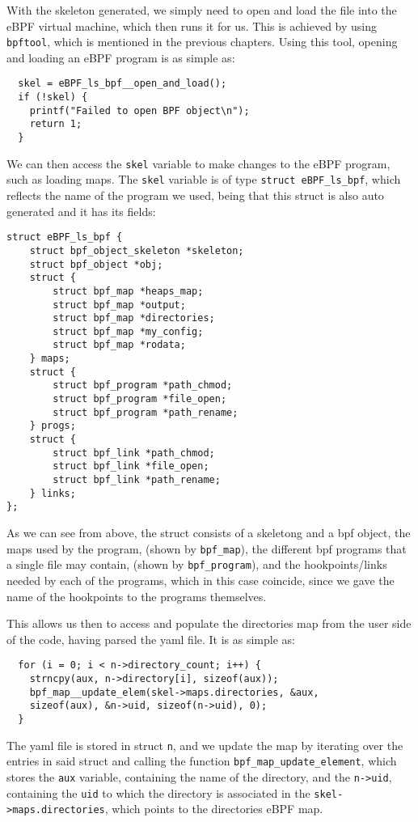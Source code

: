 With the skeleton generated, we simply need to open and load the file into the eBPF virtual machine, which then runs it for us. This is achieved by using \texttt{bpftool}, which is mentioned in the previous chapters. Using this tool, opening and loading an eBPF program is as simple as:

\begin{lstlisting}
  skel = eBPF_ls_bpf__open_and_load();
  if (!skel) {
    printf("Failed to open BPF object\n");
    return 1;
  }
\end{lstlisting}

We can then access the \texttt{skel} variable to make changes to the eBPF program, such as loading maps. The \texttt{skel} variable is of type \texttt{struct eBPF\_ls\_bpf}, which reflects the name of the program we used, being that this struct is also auto generated and it has its fields:

\begin{lstlisting}
struct eBPF_ls_bpf {
	struct bpf_object_skeleton *skeleton;
	struct bpf_object *obj;
	struct {
		struct bpf_map *heaps_map;
		struct bpf_map *output;
		struct bpf_map *directories;
		struct bpf_map *my_config;
		struct bpf_map *rodata;
	} maps;
	struct {
		struct bpf_program *path_chmod;
		struct bpf_program *file_open;
		struct bpf_program *path_rename;
	} progs;
	struct {
		struct bpf_link *path_chmod;
		struct bpf_link *file_open;
		struct bpf_link *path_rename;
	} links;
};
\end{lstlisting}

As we can see from above, the struct consists of a skeletong and a bpf object, the maps used by the program, (shown by \texttt{bpf\_map}), the different bpf programs that a single file may contain, (shown by \texttt{bpf\_program}), and the hookpoints/links needed by each of the programs, which in this case coincide, since we gave the name of the hookpoints to the programs themselves.

This allows us then to access and populate the directories map from the user side of the code, having parsed the yaml file. It is as simple as:

\begin{lstlisting}
  for (i = 0; i < n->directory_count; i++) {
    strncpy(aux, n->directory[i], sizeof(aux));
    bpf_map__update_elem(skel->maps.directories, &aux,
    sizeof(aux), &n->uid, sizeof(n->uid), 0);
  }
\end{lstlisting}

The yaml file is stored in struct \texttt{n}, and we update the map by iterating over the entries in said struct and calling the function \texttt{bpf\_map\_update\_element}, which stores the \texttt{aux} variable, containing the name of the directory, and the \texttt{n->uid}, containing the \texttt{uid} to which the directory is associated in the \texttt{skel->maps.directories}, which points to the directories eBPF map.

